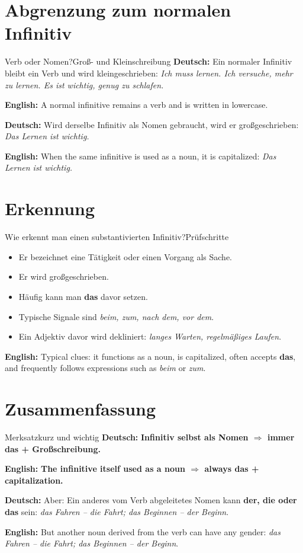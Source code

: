 \documentclass[a4paper,11pt]{article}
\newcommand{\GermanText}[1]{\textbf{Deutsch: }#1\par}
\newcommand{\EnglishText}[1]{{\small\color{SoftGray}\textbf{English: }#1\par}}
\begin{document}
\begin{preview}
\section{Abgrenzung zum normalen Infinitiv}
\begin{grammarentry}{Verb oder Nomen?}{Groß- und Kleinschreibung}
\GermanText{Ein normaler Infinitiv bleibt ein Verb und wird kleingeschrieben: \textit{Ich muss lernen. Ich versuche, mehr zu lernen. Es ist wichtig, genug zu schlafen.}}
\EnglishText{A normal infinitive remains a verb and is written in lowercase.}
\GermanText{Wird derselbe Infinitiv als Nomen gebraucht, wird er großgeschrieben: \textit{Das Lernen ist wichtig.}}
\EnglishText{When the same infinitive is used as a noun, it is capitalized: \textit{Das Lernen ist wichtig.}}
\end{grammarentry}

\section{Erkennung}
\begin{grammarentry}{Wie erkennt man einen substantivierten Infinitiv?}{Prüfschritte}
\begin{itemize}
\item Er bezeichnet eine Tätigkeit oder einen Vorgang als Sache.
\item Er wird großgeschrieben.
\item Häufig kann man \textbf{das} davor setzen.
\item Typische Signale sind \textit{beim, zum, nach dem, vor dem}.
\item Ein Adjektiv davor wird dekliniert: \textit{langes Warten, regelmäßiges Laufen}.
\end{itemize}
\EnglishText{Typical clues: it functions as a noun, is capitalized, often accepts \textbf{das}, and frequently follows expressions such as \textit{beim} or \textit{zum}.}
\end{grammarentry}

\section{Zusammenfassung}
\begin{grammarentry}{Merksatz}{kurz und wichtig}
\GermanText{\textbf{Infinitiv selbst als Nomen $\Rightarrow$ immer das + Großschreibung.}}
\EnglishText{\textbf{The infinitive itself used as a noun $\Rightarrow$ always das + capitalization.}}
\GermanText{Aber: Ein anderes vom Verb abgeleitetes Nomen kann \textbf{der, die oder das} sein: \textit{das Fahren -- die Fahrt; das Beginnen -- der Beginn}.}
\EnglishText{But another noun derived from the verb can have any gender: \textit{das Fahren -- die Fahrt; das Beginnen -- der Beginn}.}
\end{grammarentry}

\end{preview}
\end{document}
